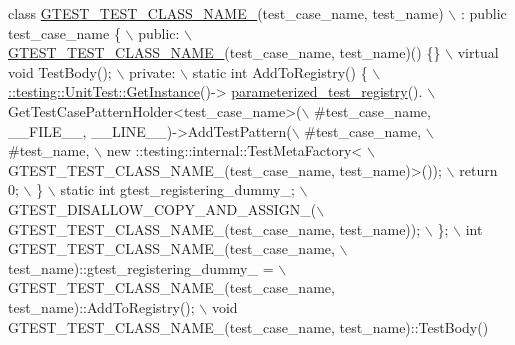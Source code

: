 \begin{DoxyCode}
\textcolor{keyword}{class }\hyperlink{fused-src_2gtest_2gtest_8h_a87a1ee3a3b9b798195236d053f2e5dcc}{GTEST\_TEST\_CLASS\_NAME\_}(test\_case\_name, test\_name) \(\backslash\)
      : \textcolor{keyword}{public} test\_case\_name \{ \(\backslash\)
   public: \hyperlink{fused-src_2gtest_2gtest_8h_a87a1ee3a3b9b798195236d053f2e5dcc}{\(\backslash\)}
\hyperlink{fused-src_2gtest_2gtest_8h_a87a1ee3a3b9b798195236d053f2e5dcc}{    GTEST\_TEST\_CLASS\_NAME\_}(test\_case\_name, test\_name)() \{\} \(\backslash\)
    virtual \textcolor{keywordtype}{void} TestBody(); \(\backslash\)
   private: \(\backslash\)
    static \textcolor{keywordtype}{int} AddToRegistry() \{ \hyperlink{classtesting_1_1_unit_test_a24192400b70b3b946746954e9574fb8e}{\(\backslash\)}
\hyperlink{classtesting_1_1_unit_test_a24192400b70b3b946746954e9574fb8e}{      ::testing::UnitTest::GetInstance}()->
      \hyperlink{classtesting_1_1_unit_test_a1d9bd4ed86901c44b525a7b6ca4cbf3b}{parameterized\_test\_registry}(). \(\backslash\)
          GetTestCasePatternHolder<test\_case\_name>(\(\backslash\)
\textcolor{preprocessor}{              #test\_case\_name, \_\_FILE\_\_, \_\_LINE\_\_)->AddTestPattern(\(\backslash\)}
\textcolor{preprocessor}{                  #test\_case\_name, \(\backslash\)}
\textcolor{preprocessor}{                  #test\_name, \(\backslash\)}
\textcolor{preprocessor}{                  new ::testing::internal::TestMetaFactory< \(\backslash\)}
\textcolor{preprocessor}{                      GTEST\_TEST\_CLASS\_NAME\_(test\_case\_name, test\_name)>()); \(\backslash\)}
\textcolor{preprocessor}{      return 0; \(\backslash\)}
\textcolor{preprocessor}{    \} \(\backslash\)}
\textcolor{preprocessor}{    static int gtest\_registering\_dummy\_; \(\backslash\)}
\textcolor{preprocessor}{    GTEST\_DISALLOW\_COPY\_AND\_ASSIGN\_(\(\backslash\)}
\textcolor{preprocessor}{        GTEST\_TEST\_CLASS\_NAME\_(test\_case\_name, test\_name)); \(\backslash\)}
\textcolor{preprocessor}{  \}; \(\backslash\)}
\textcolor{preprocessor}{  int GTEST\_TEST\_CLASS\_NAME\_(test\_case\_name, \(\backslash\)}
\textcolor{preprocessor}{                             test\_name)::gtest\_registering\_dummy\_ = \(\backslash\)}
\textcolor{preprocessor}{      GTEST\_TEST\_CLASS\_NAME\_(test\_case\_name, test\_name)::AddToRegistry(); \(\backslash\)}
\textcolor{preprocessor}{  void GTEST\_TEST\_CLASS\_NAME\_(test\_case\_name, test\_name)::TestBody()}
\end{DoxyCode}


